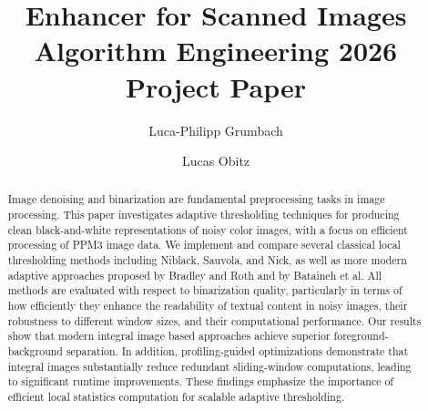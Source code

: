 \documentclass[sigconf, numbers]{acmart}
\begin{document}
\title[Enhancer for Scanned Images]{Enhancer for Scanned Images\\\large Algorithm Engineering 2026 Project Paper}


\author{Luca-Philipp Grumbach}

\author{Lucas Obitz}

\begin{abstract}

  Image denoising and binarization are fundamental preprocessing tasks in image processing. 
  This paper investigates adaptive thresholding techniques for producing clean black-and-white representations of noisy color images, with a focus on efficient processing of PPM3 image data.
  We implement and compare several classical local thresholding methods including Niblack, Sauvola, and Nick, as well as more modern adaptive approaches proposed by Bradley and Roth and by Bataineh et al.
  All methods are evaluated with respect to binarization quality, particularly in terms of how efficiently they enhance the readability of textual content in noisy images, their robustness to different window sizes, and their computational performance.
  Our results show that modern integral image based approaches achieve superior foreground-background separation.
  In addition, profiling-guided optimizations demonstrate that integral images substantially reduce redundant sliding-window computations, leading to significant runtime improvements.
  These findings emphasize the importance of efficient local statistics computation for scalable adaptive thresholding.

\end{abstract}

\end{document}
